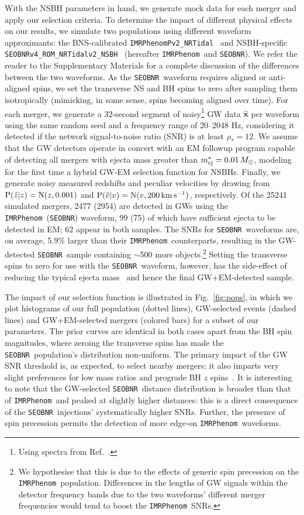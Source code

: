 \documentclass[%
 reprint,
 superscriptaddress,
 nofootinbib,
 amsmath,amssymb,
 aps,
]{revtex4-2}
\newcommand{\vobs}{\ensuremath{\hat{v}}}
\newcommand{\zobs}{\ensuremath{\hat{z}}}
\newcommand{\prob}{\ensuremath{{\rm P}}}
\newcommand{\normal}{{\rm{N}}}
\newcommand{\snrmin}{\rho_*}
\newcommand{\mejmin}{m_{\rm ej}^*}
\newcommand{\dgw}{\hat{\bm{x}}}
\newcommand{\kms}{\ensuremath{{\rm km\,s^{-1}}}}
\newcommand{\seobnr}{\texttt{SEOBNR}}
\newcommand{\seobnrfull}{\texttt{SEOBNRv4\_ROM\_NRTidalv2\_NSBH}}
\newcommand{\imrp}{\texttt{IMRPhenom}}
\newcommand{\imrpfull}{\texttt{IMRPhenomPv2\_NRTidal}}
\begin{document}
With the NSBH parameters in hand, we generate mock data for each merger and apply our selection criteria.  To determine the impact of different physical effects on our results, we simulate two populations using different waveform approximants: the BNS-calibrated \imrpfull~\cite{Dietrich_etal:2019} and NSBH-specific \seobnrfull~\cite{Matas_etal:2020} (hereafter \imrp\ and \seobnr). We refer the reader to the Supplementary Materials for a complete discussion of the differences between the two waveforms. As the \seobnr\ waveform requires aligned or anti-aligned spins, we set the transverse NS and BH spins to zero after sampling them isotropically (mimicking, in some sense, spins becoming aligned over time). For each merger, we generate a 32-second segment of noisy\footnote{Using spectra from Ref.~\cite{LVCnoise}.} GW data $\dgw$ per waveform using the same random seed and a frequency range of 20--2048 Hz, considering it detected if the network signal-to-noise ratio (SNR) is at least $\snrmin = 12$. We assume that the GW detectors operate in concert with an EM followup program capable of detecting all mergers with ejecta mass greater than $\mejmin = 0.01\,M_\odot$, modeling for the first time a hybrid GW-EM selection function for NSBHs. Finally, we generate noisy measured redshifts and peculiar velocities by drawing from $\prob(\zobs|z)=\normal(z,0.001)$ and $\prob(\vobs|v)=\normal(v,200\,\kms)$, respectively. Of the 25241 simulated mergers, 2477 (2954) are detected in GWs using the \imrp\ (\seobnr) waveform, 99 (75) of which have sufficient ejecta to be detected in EM; 62 appear in both samples. The SNRs for \seobnr\ waveforms are, on average, 5.9\% larger than their \imrp\ counterparts, resulting in the GW-detected \seobnr\ sample containing $\sim$500 more objects.\footnote{We hypothesise that this is due to the effects of generic spin precession on the \imrp\ population. Differences in the lengths of GW signals within the detector frequency bands due to the two waveforms' different merger frequencies would tend to boost the \imrp\ SNRs.}  Setting the transverse spins to zero for use with the \seobnr\ waveform, however, has the side-effect of reducing the typical ejecta mass~\cite{Foucart_etal:2018} and hence the final GW+EM-detected sample.

The impact of our selection function is illustrated in Fig.~\ref{fig:pops}, in which we plot histograms of our full population (dotted lines), GW-selected events (dashed lines) and GW+EM-selected mergers (colored bars) for a subset of our parameters. The prior curves are identical in both cases apart from the BH spin magnitudes, where zeroing the transverse spins has made the \seobnr\ population's distribution non-uniform. The primary impact of the GW SNR threshold is, as expected, to select nearby mergers; it also imparts very slight preferences for low mass ratios and prograde BH $z$ spins~\cite{Ng_etal:2018}. It is interesting to note that the GW-selected \seobnr\ distance distribution is broader than that of \imrp\ and peaked at slightly higher distances: this is a direct consequence of the \seobnr\ injections' systematically higher SNRs. Further, the presence of spin precession permits the detection of more edge-on \imrp\ waveforms.
\end{document}

